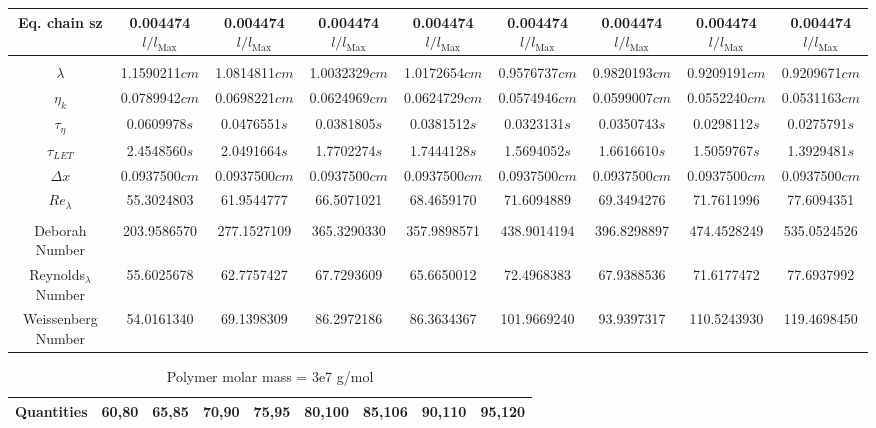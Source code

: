 \documentclass[]{article}
\begin{document}
\begin{table}
\begin{tabular}{ccccccccc}
Eq. chain sz  &  0.004474$l/l_{\text{Max}}$ &  0.004474$l/l_{\text{Max}}$ &  0.004474$l/l_{\text{Max}}$ &  0.004474$l/l_{\text{Max}}$ &  0.004474$l/l_{\text{Max}}$ &  0.004474$l/l_{\text{Max}}$ &  0.004474$l/l_{\text{Max}}$ &  0.004474$l/l_{\text{Max}}$\\ 
\hline
\\ 
$\lambda$ &   1.1590211$cm$ &   1.0814811$cm$ &   1.0032329$cm$ &   1.0172654$cm$ &   0.9576737$cm$ &   0.9820193$cm$ &   0.9209191$cm$ &   0.9209671$cm$\\ 
$\eta_{k}$ &   0.0789942$cm$ &   0.0698221$cm$ &   0.0624969$cm$ &   0.0624729$cm$ &   0.0574946$cm$ &   0.0599007$cm$ &   0.0552240$cm$ &   0.0531163$cm$\\ 
$\tau_\eta$ &   0.0609978$s$ &   0.0476551$s$ &   0.0381805$s$ &   0.0381512$s$ &   0.0323131$s$ &   0.0350743$s$ &   0.0298112$s$ &   0.0275791$s$\\ 
$\tau_{LET}$ &   2.4548560$s$ &   2.0491664$s$ &   1.7702274$s$ &   1.7444128$s$ &   1.5694052$s$ &   1.6616610$s$ &   1.5059767$s$ &   1.3929481$s$\\ 
$\Delta x$ &   0.0937500$cm$ &   0.0937500$cm$ &   0.0937500$cm$ &   0.0937500$cm$ &   0.0937500$cm$ &   0.0937500$cm$ &   0.0937500$cm$ &   0.0937500$cm$\\ 
$Re_\lambda$ &   55.3024803 &   61.9544777 &   66.5071021 &   68.4659170 &   71.6094889 &   69.3494276 &   71.7611996 &   77.6094351\\ 
\hline
\\
Deborah Number &   203.9586570 &   277.1527109 &   365.3290330 &   357.9898571 &   438.9014194 &   396.8298897 &   474.4528249 &   535.0524526\\ 
Reynolds$_\lambda$ Number &   55.6025678 &   62.7757427 &   67.7293609 &   65.6650012 &   72.4968383 &   67.9388536 &   71.6177472 &   77.6937992\\ 
Weissenberg Number &   54.0161340 &   69.1398309 &   86.2972186 &   86.3634367 &   101.9669240 &   93.9397317 &   110.5243930 &   119.4698450\\ 
\end{tabular}\end{table}\begin{table}
 \centering
 \caption{Polymer molar mass = 3e7 g/mol}
\label{table1}
\begin{tabular}{ccccccccc}
\hline
\textbf{Quantities}& \textbf{60,80}& \textbf{65,85}& \textbf{70,90}& \textbf{75,95}& \textbf{80,100}& \textbf{85,106}& \textbf{90,110}& \textbf{95,120}\\ 
\hline


\end{tabular}
\end{table}
\end{document}
